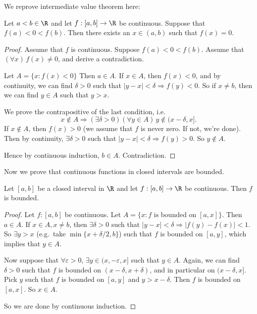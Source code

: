 \documentclass[a4paper]{article}
\begin{document}
We reprove intermediate value theorem here:

\begin{thm}
  Let $a < b\in \R$ and let $f: [a, b] \to \R$ be continuous. Suppose that $f(a) < 0 < f(b)$. Then there exists an $x\in (a, b)$ such that $f(x) = 0$.
\end{thm}

\begin{proof}
  Assume that $f$ is continuous. Suppose $f(a) < 0 < f(b)$. Assume that $(\forall x)\, f(x) \not =0$, and derive a contradiction.

  Let $A = \{x: f(x) < 0\}$ Then $a\in A$. If $x\in A$, then $f(x) < 0$, and by continuity, we can find $\delta > 0$ such that $|y - x| < \delta\Rightarrow f(y) < 0$. So if $x\not= b$, then we can find $y\in A$ such that $y > x$.

  We prove the contrapositive of the last condition, i.e.
  \[
    x\not\in A\Rightarrow (\exists \delta > 0)(\forall y\in A)\, y\not\in(x - \delta, x].
  \]
  If $x\not\in A$, then $f(x) > 0$ (we assume that $f$ is never zero. If not, we're done). Then by continuity, $\exists \delta > 0$ such that $|y - x| < \delta \Rightarrow f(y) > 0$. So $y\not\in A$.

  Hence by continuous induction, $b\in A$. Contradiction.
\end{proof}

Now we prove that continuous functions in closed intervals are bounded.
\begin{thm}
  Let $[a, b]$ be a closed interval in $\R$ and let $f: [a, b] \to \R$ be continuous. Then $f$ is bounded.
\end{thm}

\begin{proof}
  Let $f: [a, b]$ be continuous. Let $A = \{x: f\text{ is bounded on }[a, x]\}$. Then $a\in A$. If $x\in A, x\not= b$, then $\exists \delta > 0$ such that $|y - x| < \delta \Rightarrow |f(y) - f(x)| < 1$. So $\exists y > x$ (e.g.\ take $\min\{x + \delta/2, b\}$) such that $f$ is bounded on $[a, y]$, which implies that $y\in A$.

  Now suppose that $\forall \varepsilon > 0$, $\exists y\in (x, - \varepsilon, x]$ such that $y\in A$. Again, we can find $\delta > 0$ such that $f$ is bounded on $(x - \delta, x + \delta)$, and in particular on $(x - \delta, x]$. Pick $y$ such that $f$ is bounded on $[a, y]$ and $y > x - \delta$. Then $f$ is bounded on $[a, x]$. So $x\in A$.

  So we are done by continuous induction.
\end{proof}
\end{document}

